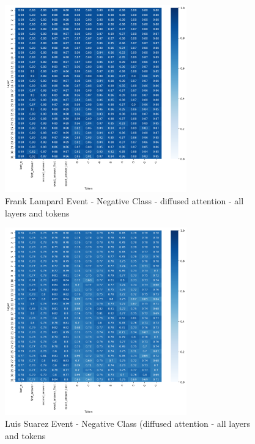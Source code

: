 \documentclass{article}
\begin{document}
\clearpage

\begin{figure}[p]
    \centering
    \includegraphics[width=0.7\textwidth]{frank_lampard_negative_class.png}
    \caption{Frank Lampard Event - Negative Class - diffused attention - all layers and tokens}
    \label{fig:lampard-negative}
\end{figure}

\clearpage

\begin{figure}[p]
    \centering
    \includegraphics[width=0.7\textwidth]{luis_suarez_negative_class.png}
    \caption{Luis Suarez Event - Negative Class (diffused attention - all layers and tokens}
    \label{fig:suarez-negative}
\end{figure}
\end{document}
